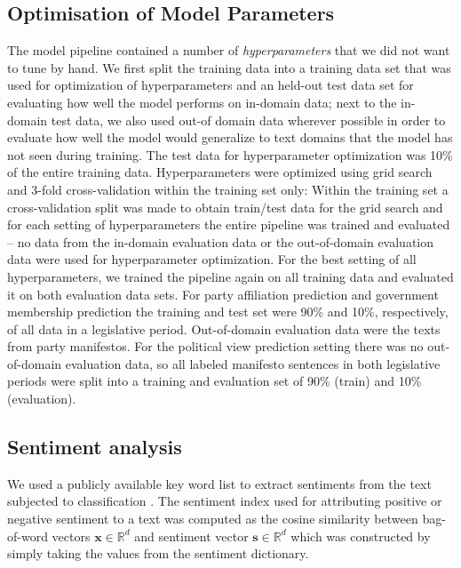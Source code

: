 \documentclass[runningheads,a4paper]{llncs}
\renewcommand{\vec}[1]{\mathbf{#1}}
\newcommand{\R}{\mathds{R}}
\begin{document}
\subsection{Optimisation of Model Parameters}\label{sec:crossvalidation}
The model pipeline contained a number of {\em hyperparameters} that we did not want to tune by hand. 
We first split the training data into a training data set that was used for optimization of hyperparameters and an held-out test data set for evaluating how well the model performs on in-domain data; next to the in-domain test data, we also used out-of domain data wherever possible in order to evaluate how well the model would generalize to text domains that the model has not seen during training. The test data for hyperparameter optimization was 10\% of the entire training data. Hyperparameters were optimized using grid search and 3-fold cross-validation within the training set only: Within the training set a cross-validation split was made to obtain train/test data for the grid search and for each setting of hyperparameters the entire pipeline was trained and evaluated -- no data from the in-domain evaluation data or the out-of-domain evaluation data were used for hyperparameter optimization. For the best setting of all hyperparameters, we trained the pipeline again on all training data and evaluated it on both evaluation data sets. For party affiliation prediction and government membership prediction the training and test set were 90\% and 10\%, respectively, of all data in a legislative period. Out-of-domain evaluation data were the texts from party manifestos. For the political view prediction setting there was no out-of-domain evaluation data, so all labeled manifesto sentences in both legislative periods were split into a training and evaluation set of 90\% (train) and 10\% (evaluation). 

\subsection{Sentiment analysis}\label{sec:sentiment_analysis_methods}
We used a publicly available key word list to extract sentiments from the text subjected to classification \cite{remquahey2010}. The sentiment index used for attributing positive or negative sentiment to a text was computed  as the cosine similarity between bag-of-word vectors $\vec{x}\in\R^d$ and sentiment vector $\vec{s}\in\R^d$ which was constructed by simply taking the values from the sentiment dictionary. 
\end{document}
